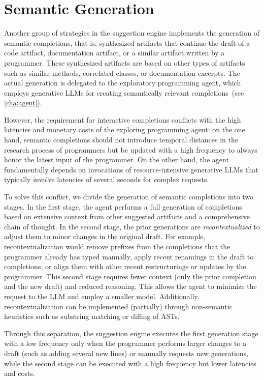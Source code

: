 
\section{Semantic Generation}
\label{sec:suggestions/generation}

Another group of strategies in the suggestion engine implements the generation of semantic completions, that is, synthesized artifacts that continue the draft of a code artifact, documentation artifact, or a similar artifact written by a programmer.
These synthesized artifacts are based on other types of artifacts such as similar methods, correlated classes, or documentation excerpts.
The actual generation is delegated to the exploratory programming agent, which employs generative LLMs for creating semantically relevant completions~(see \cref{cha:agent}).

However, the requirement for interactive completions conflicts with the high latencies and monetary costs of the exploring programming agent:
on the one hand, semantic completions should not introduce temporal distances in the research process of programmers but be updated with a high frequency to always honor the latest input of the programmer.
On the other hand, the agent fundamentally depends on invocations of resource-intensive generative LLMs that typically involve latencies of several seconds for complex requests.

To solve this conflict, we divide the generation of semantic completions into two stages.
In the first stage, the agent performs a full generation of completions based on extensive context from other suggested artifacts and a comprehensive chain of thought.
In the second stage, the prior generations are \emph{recontextualized} to adjust them to minor changes in the original draft.
For example, recontextualization would remove prefixes from the completions that the programmer already has typed manually, apply recent renamings in the draft to completions, or align them with other recent restructurings or updates by the programmer.
This second stage requires fewer context (only the prior completion and the new draft) and reduced reasoning.
This allows the agent to minimize the request to the LLM and employ a smaller model.
Additionally, recontextualization can be implemented (partially) through non-semantic heuristics such as substring matching or diffing of ASTs.

Through this separation, the suggestion engine executes the first generation stage with a low frequency only when the programmer performs larger changes to a draft (such as adding several new lines) or manually requests new generations, while the second stage can be executed with a high frequency but lower latencies and costs.
